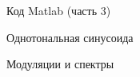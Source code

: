 \documentclass[12pt,a4paper]{scrartcl}
\begin{document}
\begin{figure}[h!]
\caption{Код Matlab (часть 3)}
\end{figure}

\begin{figure}[h!]
\caption{Однотональная синусоида}
\end{figure}

\begin{figure}[h!]
\caption{Модуляции и спектры}
\end{figure}
\end{document}
